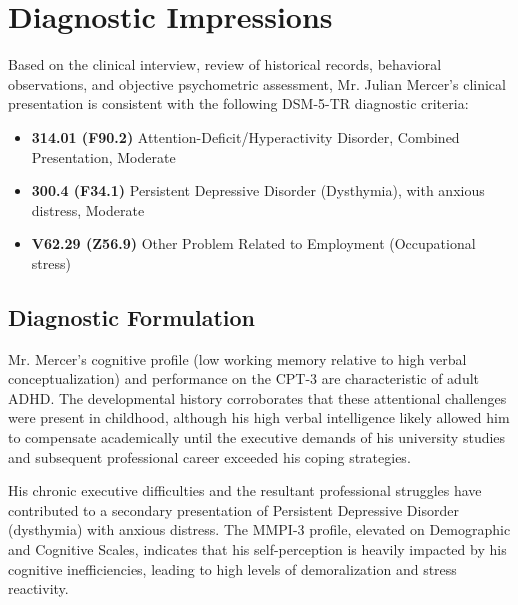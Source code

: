 \section{Diagnostic Impressions}

Based on the clinical interview, review of historical records, behavioral observations, and objective psychometric assessment, Mr. Julian Mercer's clinical presentation is consistent with the following DSM-5-TR diagnostic criteria:

\begin{tcolorbox}[psychbox, title=DSM-5-TR Diagnostic Formulation]
\begin{itemize}[leftmargin=*]
    \item \textbf{314.01 (F90.2)} Attention-Deficit/Hyperactivity Disorder, Combined Presentation, Moderate
    \item \textbf{300.4 (F34.1)} Persistent Depressive Disorder (Dysthymia), with anxious distress, Moderate
    \item \textbf{V62.29 (Z56.9)} Other Problem Related to Employment (Occupational stress)
\end{itemize}
\end{tcolorbox}

\subsection{Diagnostic Formulation}
Mr. Mercer's cognitive profile (low working memory relative to high verbal conceptualization) and performance on the CPT-3 are characteristic of adult ADHD. The developmental history corroborates that these attentional challenges were present in childhood, although his high verbal intelligence likely allowed him to compensate academically until the executive demands of his university studies and subsequent professional career exceeded his coping strategies. 

His chronic executive difficulties and the resultant professional struggles have contributed to a secondary presentation of Persistent Depressive Disorder (dysthymia) with anxious distress. The MMPI-3 profile, elevated on Demographic and Cognitive Scales, indicates that his self-perception is heavily impacted by his cognitive inefficiencies, leading to high levels of demoralization and stress reactivity.
